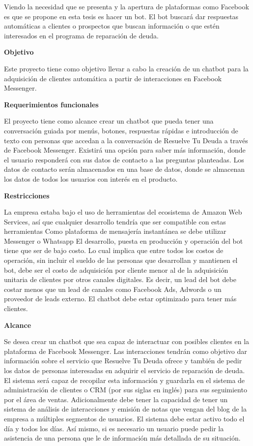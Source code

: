 Viendo la necesidad que se presenta y la apertura de plataformas como Facebook es que se propone en esta tesis es hacer un bot. El bot buscará dar respuestas automáticas a clientes o prospectos que buscan información o que estén interesados en el programa de reparación de deuda.

\textbf{Objetivo}

Este proyecto tiene como objetivo llevar a cabo la creación de un chatbot para la adquisición de clientes automática a partir de interacciones en Facebook Messenger.

\textbf{Requerimientos funcionales}

El proyecto tiene como alcance crear un chatbot que pueda tener una conversación guiada por menús, botones, respuestas rápidas e introducción de texto con personas que accedan a la conversación de Resuelve Tu Deuda a través de Facebook Messenger. Existirá una opción para saber más información, donde el usuario responderá con sus datos de contacto a las preguntas planteadas. Los datos de contacto serán almacenados en una base de datos, donde se almacenan los datos de todos los usuarios con interés en el producto.

\textbf{Restricciones}

La empresa estaba bajo el uso de herramientas del ecosistema de Amazon Web Services, así que cualquier desarrollo tendría que ser compatible con estas herramientas
Como plataforma de mensajería instantánea se debe utilizar Messenger o Whatsapp
El desarrollo, puesta en producción y operación del bot tiene que ser de bajo costo. Lo cual implica que entre todos los costos de operación, sin incluir el sueldo de las personas que desarrollan y mantienen el bot, debe ser el costo de adquisición por cliente menor al de la adquisición unitaria de clientes por otros canales digitales. Es decir, un lead del bot debe costar menos que un lead de canales como Facebook Ads, Adwords o un proveedor de leads externo.
El chatbot debe estar optimizado para tener más clientes.

\textbf{Alcance}

Se desea crear un chatbot que sea capaz de interactuar con posibles clientes en la plataforma de Facebook Messenger. Las interacciones tendrán como objetivo dar información sobre el servicio que Resuelve Tu Deuda ofrece y también de pedir los datos de personas interesadas en adquirir el servicio de reparación de deuda. El sistema será capaz de recopilar esta información y guardarla en el sistema de administración de clientes o CRM (por sus siglas en inglés) para sus seguimiento por el área de ventas. Adicionalmente debe tener la capacidad de tener un sistema de análisis de interacciones y emisión de notas que vengan del blog de la empresa a múltiples segmentos de usuarios. El sistema debe estar activo todo el día y todos los días. Así mismo, si es necesario un usuario puede pedir la asistencia de una persona que le de información más detallada de su situación.

